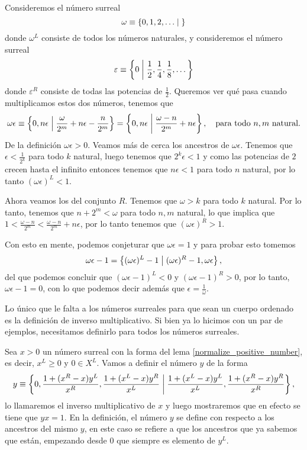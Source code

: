    \begin{example}
        Consideremos el n\'umero surreal
        \[
            \omega \equiv \left\{0,1,2,\dots\;\middle|\; \right\}
        \]
        donde $\omega^L$ consiste de todos los n\'umeros naturales, y consideremos el n\'umero surreal
        \[
            \varepsilon \equiv \left\{0\;\middle|\; \frac{1}{2}, \frac{1}{4}, \frac{1}{8}, \dots\right\}
        \]
        donde $\varepsilon^R$ consiste de todas las potencias de $\frac{1}{2}$. Queremos ver qu\'e pasa cuando multiplicamos estos dos n\'umeros, tenemos que 
        \[
            \omega\epsilon \equiv \left\{0,n\epsilon\;\middle|\; \frac{\omega}{2^m} + n\epsilon - \frac{n}{2^m}\right\} = \left\{0,n\epsilon\;\middle|\; \frac{\omega - n}{2^m} + n\epsilon\right\},\quad\text{para todo $n,m$ natural}.
        \]
        De la definici\'on $\omega\epsilon  > 0$. Veamos m\'as de cerca los ancestros de $\omega\epsilon$. Tenemos que $\epsilon < \frac{1}{2^k}$ para todo $k$ natural, luego tenemos que $2^k\epsilon < 1$ y como las potencias de $2$ crecen hasta el infinito entonces tenemos que $n\epsilon < 1$ para todo $n$ natural, por lo tanto $(\omega\epsilon)^L < 1$.

        Ahora veamos los del conjunto $R$. Tenemos que $\omega > k$ para todo $k$ natural. Por lo tanto, tenemos que $n + 2^m < \omega$ para todo $n,m$ natural, lo que implica que $1 < \frac{\omega - n}{2^m} < \frac{\omega - n}{2^m} + n\epsilon$, por lo tanto tenemos que $(\omega\epsilon)^R > 1$.
        
        Con esto en mente, podemos conjeturar que $\omega\epsilon = 1$ y para probar esto tomemos
        \[
            \omega\epsilon - 1 = \left\{(\omega\epsilon)^L - 1\;\middle|\; (\omega\epsilon)^R - 1, \omega\epsilon\right\},
        \]
        del que podemos concluir que $(\omega\epsilon - 1)^L < 0$ y $(\omega\epsilon - 1)^R > 0$, por lo tanto, $\omega\epsilon - 1 = 0$, con lo que podemos decir adem\'as que $\epsilon = \frac{1}{\omega}$.
    \end{example}

    Lo \'unico que le falta a los n\'umeros surreales para que sean un cuerpo ordenado es la definici\'on de inverso multiplicativo. Si bien ya lo hicimos con un par de ejemplos, necesitamos definirlo para todos los n\'umeros surreales.

    \begin{definition}
        Sea $x > 0$ un n\'umero surreal con la forma del lema \ref{normalize_positive_number}, es decir, $x^L \ge 0$ y $0\in X^L$. Vamos a definir el n\'umero $y$ de la forma
        \[
            y \equiv \left\{0, \frac{1+(x^R-x)y^L}{x^R}, \frac{1+(x^L-x)y^R}{x^L}\;\middle|\; \frac{1+(x^L-x)y^L}{x^L}, \frac{1+(x^R-x)y^R}{x^R}\right\},
        \]
        lo llamaremos el inverso multiplicativo de $x$ y luego mostraremos que en efecto se tiene que $yx=1$. En la definici\'on, el n\'umero $y$ se define con respecto a los ancestros del mismo $y$, en este caso se refiere a que los ancestros que ya sabemos que est\'an, empezando desde $0$ que siempre es elemento de $y^L$.
    \end{definition}

